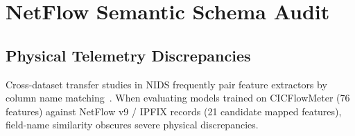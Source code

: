 \documentclass[journal]{IEEEtran}
\begin{document}
\section{NetFlow Semantic Schema Audit}
\label{sec:audit}

\subsection{Physical Telemetry Discrepancies}
Cross-dataset transfer studies in NIDS frequently pair feature extractors by column name matching~\cite{sarhan2022nftoniot,cantone2024crossdataset}. When evaluating models trained on CICFlowMeter (76 features) against NetFlow v9 / IPFIX records (21 candidate mapped features), field-name similarity obscures severe physical discrepancies.
\end{document}
